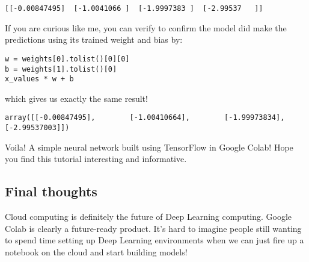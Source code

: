 \begin{lstlisting}
[[-0.00847495]  [-1.0041066 ]  [-1.9997383 ]  [-2.99537   ]]
\end{lstlisting}
If you are curious like me, you can verify to confirm the model did make the predictions using its trained weight and bias by:

\begin{lstlisting}
w = weights[0].tolist()[0][0]
b = weights[1].tolist()[0]
x_values * w + b
\end{lstlisting}
which gives us exactly the same result!

\begin{lstlisting}
array([[-0.00847495],        [-1.00410664],        [-1.99973834],        [-2.99537003]])
\end{lstlisting}
Voila! A simple neural network built using TensorFlow in Google Colab! Hope you find this tutorial interesting and informative.

\subsection{Final thoughts}

Cloud computing is definitely the future of Deep Learning computing. Google Colab is clearly a future-ready product. It's hard to imagine people still wanting to spend time setting up Deep Learning environments when we can just fire up a notebook on the cloud and start building models!


